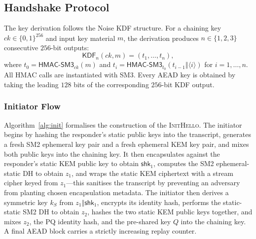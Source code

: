 \documentclass{SCIS2026}
\newcommand{\initmsg}{\textsc{InitHello}\xspace}
\newcommand{\concat}{\mathbin{\Vert}}
\newcommand{\KDF}{\mathsf{KDF}}
\begin{document}
\subsection{Handshake Protocol}
\label{sec:handshake}

The key derivation follows the Noise KDF structure.  For a chaining
key $ck \in \{0,1\}^{256}$ and input key material $m$, the
derivation produces $n\in\{1,2,3\}$ consecutive $256$-bit outputs:
\[
\KDF_n(ck, m) = (t_1, \dots, t_n),
\]
where $t_0 = \textsf{HMAC-SM3}_{ck}(m)$ and
$t_i = \textsf{HMAC-SM3}_{t_0}(t_{i-1} \concat \langle i \rangle)$
for $i=1,\dots,n$.  All HMAC calls are instantiated with SM3.  Every
AEAD key is obtained by taking the leading $128$ bits of the
corresponding $256$-bit KDF output.

\subsubsection{Initiator Flow}

Algorithm~\ref{alg:init} formalises the construction of the
\initmsg.  The initiator begins by hashing the responder's static
public keys into the transcript, generates a fresh SM2 ephemeral key
pair and a fresh ephemeral KEM key pair, and mixes both public keys
into the chaining key.  It then encapsulates against the responder's
static KEM public key to obtain $\textsf{shk}_1$, computes the SM2
ephemeral-static DH to obtain $z_1$, and wraps the static KEM
ciphertext with a stream cipher keyed from $z_1$---this sanitises
the transcript by preventing an adversary from planting chosen
encapsulation metadata.  The initiator then derives a symmetric key
$k_S$ from $z_1 \concat \textsf{shk}_1$, encrypts its identity hash,
performs the static-static SM2 DH to obtain $z_2$, hashes the two
static KEM public keys together, and mixes $z_2$, the PQ identity
hash, and the pre-shared key $Q$ into the chaining key.  A final
AEAD block carries a strictly increasing replay counter.
\end{document}
